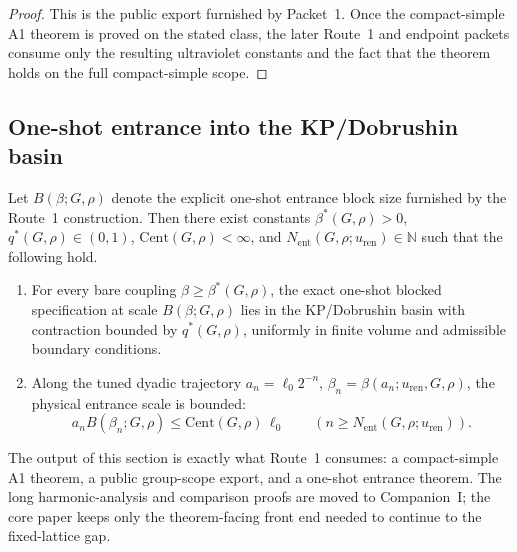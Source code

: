 \begin{proof}
This is the public export furnished by Packet~1. Once the compact-simple A1 theorem is proved on the stated class, the later Route~1 and endpoint packets consume only the resulting ultraviolet constants and the fact that the theorem holds on the full compact-simple scope.
\end{proof}

\subsection{One-shot entrance into the KP/Dobrushin basin}

\begin{proposition}\label{prop:one-shot-entrance}
Let $B(\beta;G,\rho)$ denote the explicit one-shot entrance block size furnished by the Route~1 construction. Then there exist constants $\beta^*(G,\rho)>0$, $q^*(G,\rho)\in(0,1)$, $\mathrm{Cent}(G,\rho)<\infty$, and $N_{\mathrm{ent}}(G,\rho;u_{\mathrm{ren}})\in\mathbb N$ such that the following hold.
\begin{enumerate}[label=\textup{(\alph*)}]
    \item For every bare coupling $\beta\geq \beta^*(G,\rho)$, the exact one-shot blocked specification at scale $B(\beta;G,\rho)$ lies in the KP/Dobrushin basin with contraction bounded by $q^*(G,\rho)$, uniformly in finite volume and admissible boundary conditions.
    \item Along the tuned dyadic trajectory $a_n=\ell_0 2^{-n}$, $\beta_n=\beta(a_n;u_{\mathrm{ren}},G,\rho)$, the physical entrance scale is bounded:
    \[
      a_n B(\beta_n;G,\rho)\leq \mathrm{Cent}(G,\rho)\,\ell_0\qquad (n\geq N_{\mathrm{ent}}(G,\rho;u_{\mathrm{ren}})).
    \]
\end{enumerate}
\end{proposition}

The output of this section is exactly what Route~1 consumes: a compact-simple A1 theorem, a public group-scope export, and a one-shot entrance theorem. The long harmonic-analysis and comparison proofs are moved to Companion~I; the core paper keeps only the theorem-facing front end needed to continue to the fixed-lattice gap.
